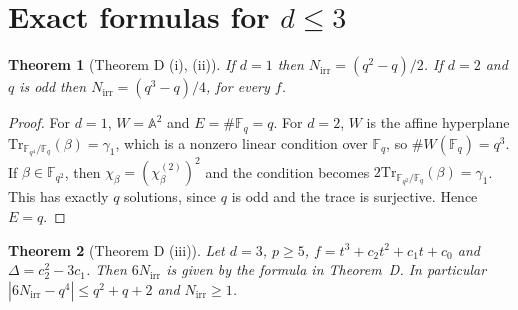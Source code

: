\documentclass[11pt,a4paper]{article}
\newtheorem{theorem}{Theorem}[section]
\theoremstyle{definition}
\theoremstyle{remark}
\newcommand{\Fq}{\mathbb{F}_q}
\newcommand{\A}{\mathbb{A}}
\newcommand{\Tr}{\mathrm{Tr}}
\newcommand{\Nirr}{N_{\mathrm{irr}}}
\begin{document}
\section{Exact formulas for $d\le3$}\label{sec:small}

\begin{theorem}[Theorem D (i), (ii)]
If $d=1$ then $\Nirr=(q^2-q)/2$. If $d=2$ and $q$ is odd then $\Nirr=(q^3-q)/4$, for every $f$.
\end{theorem}

\begin{proof}
For $d=1$, $W=\A^2$ and $E=\#\Fq=q$. For $d=2$, $W$ is the affine hyperplane
$\Tr_{\mathbb{F}_{q^4}/\Fq}(\beta)=\gamma_1$, which is a nonzero linear condition over $\Fq$,
so $\#W(\Fq)=q^3$. If $\beta\in\mathbb{F}_{q^2}$, then $\chi_\beta=(\chi^{(2)}_\beta)^2$ and the
condition becomes $2\Tr_{\mathbb{F}_{q^2}/\Fq}(\beta)=\gamma_1$. This has exactly $q$ solutions,
since $q$ is odd and the trace is surjective. Hence $E=q$.
\end{proof}

\begin{theorem}[Theorem D (iii)]\label{thm:d3}
Let $d=3$, $p\ge5$, $f=t^3+c_2t^2+c_1t+c_0$ and $\Delta=c_2^2-3c_1$. Then $6\Nirr$ is given by the
formula in Theorem~D. In particular $|6\Nirr-q^4|\le q^2+q+2$ and $\Nirr\ge1$.
\end{theorem}
\end{document}
